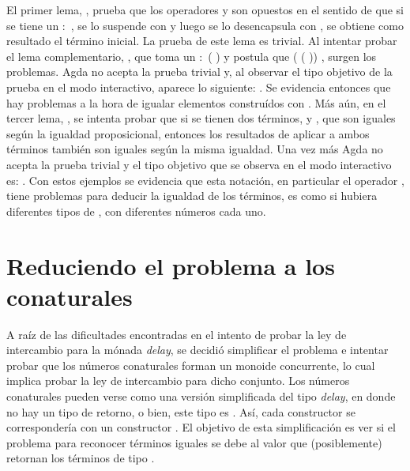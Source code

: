 El primer lema, \AgdaFunction{$\equiv\sharp\flat$}, prueba que los operadores \AgdaField{$\flat$} y \AgdaCoinductiveConstructor{$\sharp$} son opuestos en el sentido de que si se tiene un  $:$  \AgdaDatatype{$\bot$}, se lo suspende con \AgdaCoinductiveConstructor{$\sharp$} y luego se lo desencapsula con \AgdaField{$\flat$}, se obtiene como resultado el término inicial. La prueba de este lema es trivial. Al intentar probar el lema complementario, \AgdaFunction{$\equiv\flat\sharp$}, que toma un  $:$ \AgdaFunction{$\infty$} ( \AgdaDatatype{$\bot$}) y postula que (\AgdaCoinductiveConstructor{$\sharp$} (\AgdaField{$\flat$} )) \AgdaFunction{$\equiv$} , surgen los problemas. Agda no acepta la prueba trivial y, al observar el tipo objetivo de la prueba en el modo interactivo, aparece lo siguiente: . Se evidencia entonces que hay problemas a la hora de igualar elementos construídos con \AgdaCoinductiveConstructor{$\sharp$}. Más aún, en el tercer lema, \AgdaFunction{$\equiv\Rightarrow\sharp\equiv$}, se intenta probar que si se tienen dos términos,  y , que son iguales según la igualdad proposicional, entonces los resultados de aplicar \AgdaCoinductiveConstructor{$\sharp$} a ambos términos también son iguales según la misma igualdad. Una vez más Agda no acepta la prueba trivial y el tipo objetivo que se observa en el modo interactivo es: . Con estos ejemplos se evidencia que esta notación, en particular el operador \AgdaCoinductiveConstructor{$\sharp$}, tiene problemas para deducir la igualdad de los términos, es como si hubiera diferentes tipos de \AgdaCoinductiveConstructor{$\sharp$}, con diferentes números cada uno. 

\section{Reduciendo el problema a los conaturales}

A raíz de las dificultades encontradas en el intento de probar la ley de intercambio para la mónada \textit{delay}, se decidió simplificar el problema e intentar probar que los números conaturales forman un monoide concurrente, lo cual implica probar la ley de intercambio para dicho conjunto. Los números conaturales pueden verse como una versión simplificada del tipo \textit{delay}, en donde no hay un tipo de retorno, o bien, este tipo es \AgdaDatatype{$\top$}. Así, cada constructor  se correspondería con un constructor . El objetivo de esta simplificación es ver si el problema para reconocer términos iguales se debe al valor que (posiblemente) retornan los términos de tipo  \AgdaDatatype{$\bot$}. 


